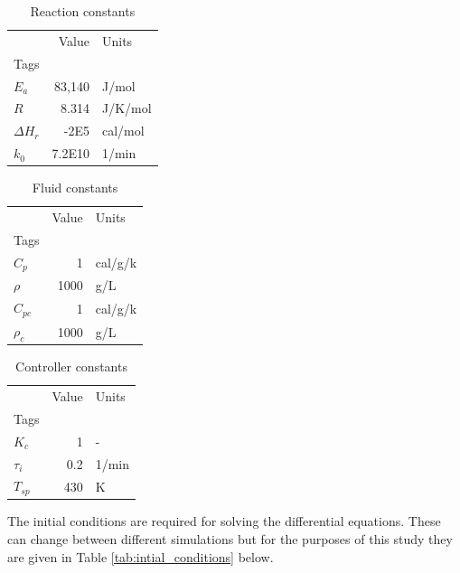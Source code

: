 \documentclass{article}
\begin{document}
\begin{table}[H]
	\caption{Reaction constants}
	\label{tab:reaction_constants}
	\centering
	\begin{tabular}{lrl}
		\toprule
		{} &  Value &  Units \\
		Tags &        &        \\
		\midrule
		$E_a$  &      83,140 &  J/mol \\
		$R$  &    8.314 &   J/K/mol \\
		$\Delta H_r$  &    -2E5 &      cal/mol \\		
		$k_0$  &    7.2E10	 &      1/min \\
		\bottomrule
	\end{tabular}
\end{table}



\begin{table}[H]
	\caption{Fluid constants}
	\label{tab:fluid_constants}
	\centering
	\begin{tabular}{lrl}
		\toprule
		{} &  Value &  Units \\
		Tags &        &        \\
		\midrule
		$C_p$  &     1 &  cal/g/k \\
		$\rho$  &     1000 &  g/L \\
		$C_{pc}$  &    1 &   cal/g/k \\
		$\rho_c$  &     1000 &  g/L \\
	\end{tabular}
\end{table}



\begin{table}[H]
	\caption{Controller constants}
	\label{tab:controller_constants}
	\centering
	\begin{tabular}{lrl}
		\toprule
		{} &  Value &  Units \\
		Tags &        &        \\
		\midrule
		$K_c$  &     1 &  - \\
		$\tau_i$  &    0.2 &   1/min \\
		$T_{sp}$  &    430 &   K \\
	\end{tabular}
\end{table}

The initial conditions are required for solving the differential equations. These can change between different simulations but for the purposes of this study they are given in Table \ref{tab:intial_conditions} below.
\end{document}
